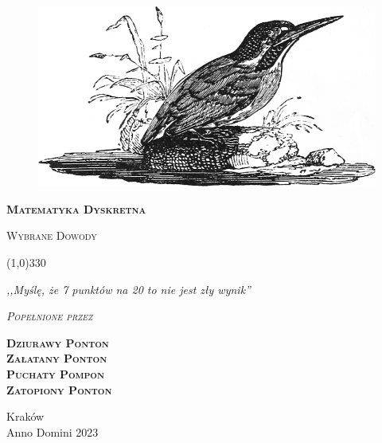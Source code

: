 \begin{titlepage}

	\begin{center}
		\begin{figure}[h]
			\centering
			\includegraphics[scale=0.35]{images/Alycon.png}
		\end{figure}
		\vspace{0.5cm}
		\Huge
		\textbf{\textsc{Matematyka Dyskretna}}

		\vspace{0.5cm}
		\Large
		\textsc{Wybrane Dowody}

		\normalsize


		\line(1,0){330}

		\vspace{1cm}
		\textit{,,Myślę, że 7 punktów na 20 to nie jest zły wynik''}
		\vspace{1cm}

		\textit{\textsc{Popełnione przez}}\\
		\vspace{5mm}

		\textbf{\textsc{Dziurawy Ponton \\ Załatany Ponton \\ Puchaty Pompon \\ Zatopiony Ponton}}

		\vfill

		Kraków \\
		Anno Domini 2023

	\end{center}

\end{titlepage}